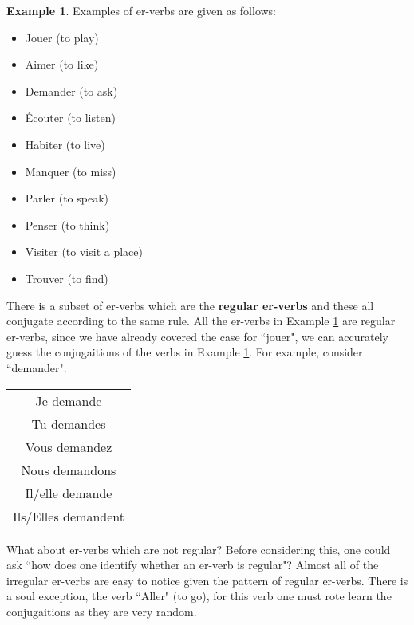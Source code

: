 \documentclass[12pt]{article}
\theoremstyle{plain}
\theoremstyle{definition}
\newtheorem{example}[thm]{Example}
\begin{document}
	\begin{example}\label{ex:example}
		Examples of er-verbs are given as follows:
		\begin{itemize}
			\item Jouer (to play)
			\item Aimer (to like)
			\item Demander (to ask)
			\item Écouter (to listen)
			\item Habiter (to live)
			\item Manquer (to miss)
			\item Parler (to speak)
			\item Penser (to think)
			\item Visiter (to visit a place)
			\item Trouver (to find)
			\end{itemize}
		\end{example}
	There is a subset of er-verbs which are the \textbf{regular er-verbs} and these all conjugate according to the same rule. All the er-verbs in Example \ref{ex:example} are regular er-verbs, since we have already covered the case for ``jouer", we can accurately guess the conjugaitions of the verbs in Example \ref{ex:example}. For example, consider ``demander".
	\begin{center}
		\begin{tabular}{| c |}
			\hline
			Je demande\\
			Tu demandes\\
			Vous demandez\\
			Nous demandons\\
			Il/elle demande\\
			Ils/Elles demandent\\
			\hline
			\end{tabular}
		\end{center}
	What about er-verbs which are not regular? Before considering this, one could ask ``how does one identify whether an er-verb is regular"? Almost all of the irregular er-verbs are easy to notice given the pattern of regular er-verbs. There is a soul exception, the verb ``Aller" (to go), for this verb one must rote learn the conjugaitions as they are very random.
	
\end{document}
